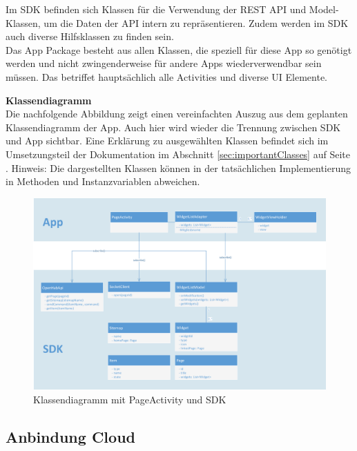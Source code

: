 Im SDK befinden sich Klassen für die Verwendung der REST API und Model-Klassen, um die Daten der API intern zu repräsentieren. Zudem werden im SDK auch diverse Hilfsklassen zu finden sein. \\
Das App Package besteht aus allen Klassen, die speziell für diese App so genötigt werden und nicht zwingenderweise für andere Apps wiederverwendbar sein müssen. Das betriffet hauptsächlich alle Activities und diverse UI Elemente.

\textbf{Klassendiagramm}\\
Die nachfolgende Abbildung zeigt einen vereinfachten Auszug aus dem geplanten Klassendiagramm der App. Auch hier wird wieder die Trennung zwischen SDK und App sichtbar. Eine Erklärung zu ausgewählten Klassen befindet sich im Umsetzungsteil der Dokumentation im Abschnitt \ref{sec:importantClasses} auf Seite \pageref{sec:importantClasses}. Hinweis: Die dargestellten Klassen können in der tatsächlichen Implementierung in Methoden und Instanzvariablen abweichen.
\begin{figure}[H]
	\centering
		\includegraphics[width=\textwidth]{report/img/android_uml.png}
	\caption{Klassendiagramm mit PageActivity und SDK}
	\label{fig:androidUML}
\end{figure}


\subsection{Anbindung Cloud}

